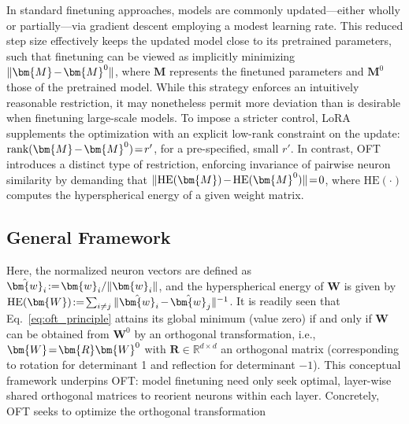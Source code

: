 In standard finetuning approaches, models are commonly updated—either wholly or partially—via gradient descent employing a modest learning rate. This reduced step size effectively keeps the updated model close to its pretrained parameters, such that finetuning can be viewed as implicitly minimizing $\thickmuskip=2mu \medmuskip=2mu \| \bm{M} - \bm{M}^0\|$, where $\bm{M}$ represents the finetuned parameters and $\bm{M}^0$ those of the pretrained model. While this strategy enforces an intuitively reasonable restriction, it may nonetheless permit more deviation than is desirable when finetuning large-scale models. To impose a stricter control, LoRA supplements the optimization with an explicit low-rank constraint on the update: $\thickmuskip=2mu \medmuskip=2mu \text{rank}(\bm{M} - \bm{M}^0)=r'$, for a pre-specified, small $r'$. In contrast, OFT introduces a distinct type of restriction, enforcing invariance of pairwise neuron similarity by demanding that $\thickmuskip=2mu \medmuskip=2mu \| \text{HE}(\bm{M})-\text{HE}(\bm{M}^0) \|=0$, where $\text{HE}(\cdot)$ computes the hyperspherical energy of a given weight matrix. 

\subsection{General Framework}

Here, the normalized neuron vectors are defined as $\thickmuskip=2mu \medmuskip=2mu \hat{\bm{w}}_i:=\bm{w}_i/\|\bm{w}_i\|$, and the hyperspherical energy of $\bm{W}$ is given by $\thickmuskip=2mu \medmuskip=2mu \text{HE}(\bm{W}):= \sum_{i\neq j} \|\hat{\bm{w}}_i-\hat{\bm{w}}_j\|^{-1}$. It is readily seen that Eq.~\eqref{eq:oft_principle} attains its global minimum (value zero) if and only if $\bm{W}$ can be obtained from $\bm{W}^0$ by an orthogonal transformation, i.e., $\thickmuskip=2mu \medmuskip=2mu \bm{W} = \bm{R}\bm{W}^0$ with $\bm{R}\in\mathbb{R}^{d\times d}$ an orthogonal matrix (corresponding to rotation for determinant 1 and reflection for determinant $-1$). This conceptual framework underpins OFT: model finetuning need only seek optimal, layer-wise shared orthogonal matrices to reorient neurons within each layer. Concretely, OFT seeks to optimize the orthogonal transformation


